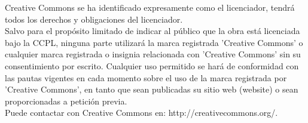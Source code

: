 Creative Commons se ha identificado expresamente como el licenciador, tendr\'a todos los derechos y obligaciones del licenciador.\\

Salvo para el prop\'osito limitado de indicar al p\'ublico que la obra est\'a licenciada bajo la CCPL, ninguna parte utilizar\'a la marca registrada 'Creative Commons' o cualquier marca registrada o insignia relacionada con 'Creative Commons' sin su consentimiento por escrito. Cualquier uso permitido se har\'a de conformidad con las pautas vigentes en cada momento sobre el uso de la marca registrada por 'Creative Commons', en tanto que sean publicadas su sitio web (website) o sean proporcionadas a petici\'on previa.\\

Puede contactar con Creative Commons en: http://creativecommons.org/.
